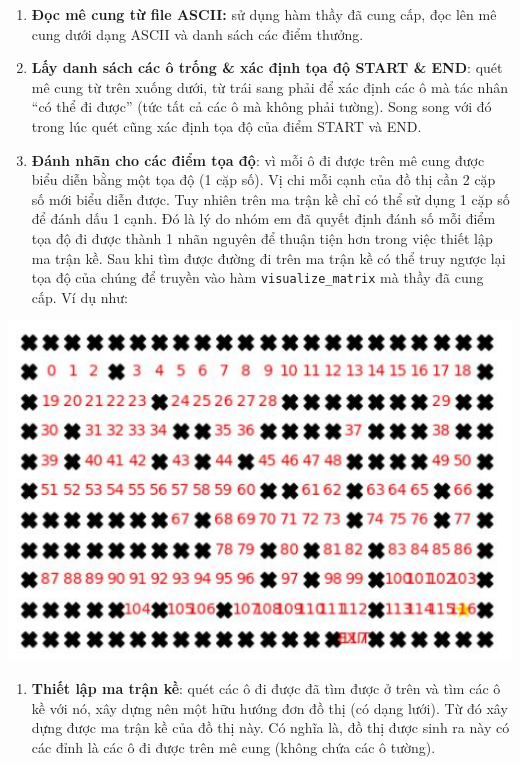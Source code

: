 \documentclass{report}
\providecommand{\tightlist}{%
      \setlength{\itemsep}{0pt}\setlength{\parskip}{0pt}}
\begin{document}
\begin{enumerate}
\def\labelenumi{\arabic{enumi}.}
\tightlist
\item
  \textbf{Đọc mê cung từ file ASCII:} sử dụng hàm thầy đã cung cấp, đọc
  lên mê cung dưới dạng ASCII và danh sách các điểm thưởng.
\item
  \textbf{Lấy danh sách các ô trống \& xác định tọa độ START \& END}:
  quét mê cung từ trên xuống dưới, từ trái sang phải để xác định các ô
  mà tác nhân ``có thể đi được'' (tức tất cả các ô mà không phải tường).
  Song song với đó trong lúc quét cũng xác định tọa độ của điểm START và
  END.
\item
  \textbf{Đánh nhãn cho các điểm tọa độ}: vì mỗi ô đi được trên mê cung
  được biểu diễn bằng một tọa độ (1 cặp số). Vị chi mỗi cạnh của đồ thị
  cần 2 cặp số mới biểu diễn được. Tuy nhiên trên ma trận kề chỉ có thể
  sử dụng 1 cặp số để đánh dấu 1 cạnh. Đó là lý do nhóm em đã quyết định
  đánh số mỗi điểm tọa độ đi được thành 1 nhãn nguyên để thuận tiện hơn
  trong việc thiết lập ma trận kề. Sau khi tìm được đường đi trên ma
  trận kề có thể truy ngược lại tọa độ của chúng để truyền vào hàm
  \texttt{visualize\_matrix} mà thầy đã cung cấp. Ví dụ như:
\end{enumerate}

\includegraphics{images/labeling-example.jpg}

\begin{enumerate}
\def\labelenumi{\arabic{enumi}.}
\setcounter{enumi}{3}
\tightlist
\item
  \textbf{Thiết lập ma trận kề}: quét các ô đi được đã tìm được ở trên
  và tìm các ô kề với nó, xây dựng nên một hữu hướng đơn đồ thị (có dạng
  lưới). Từ đó xây dựng được ma trận kề của đồ thị này. Có nghĩa là, đồ
  thị được sinh ra này có các đỉnh là các ô đi được trên mê cung (không
  chứa các ô tường).
\end{enumerate}
\end{document}
